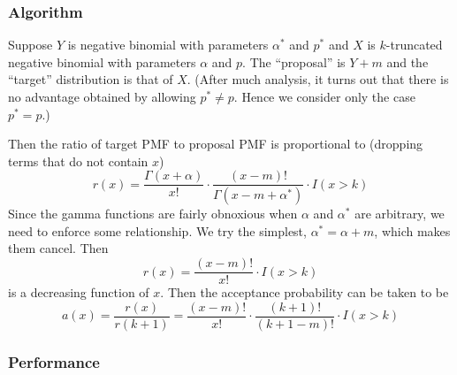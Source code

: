 \documentclass[11pt]{article}
\begin{document}
\subsubsection{Algorithm}

Suppose $Y$ is negative binomial with parameters $\alpha^*$ and $p^*$
and $X$ is $k$-truncated negative binomial with parameters $\alpha$ and $p$.
The ``proposal'' is $Y + m$ and the ``target'' distribution is that of $X$.
(After much analysis, it turns out that there is no advantage obtained
by allowing $p^* \neq p$.  Hence we consider only the case $p^* = p$.)

Then the ratio of target PMF to proposal PMF is proportional to
(dropping terms that do not contain $x$)
$$
   r(x)
   =
   \frac{\Gamma(x + \alpha)}{x !}
   \cdot
   \frac{(x - m) !}{\Gamma(x - m + \alpha^*)}
   \cdot
   I(x > k)
$$
Since the gamma functions are fairly obnoxious when $\alpha$ and $\alpha^*$
are arbitrary, we need to enforce some relationship.  We try the simplest,
$\alpha^* = \alpha + m$, which makes them cancel.
Then
$$
   r(x)
   =
   \frac{(x - m) !}{x !}
   \cdot
   I(x > k)
$$
is a decreasing function of $x$.
Then the acceptance probability
can be taken to be
$$
   a(x)
   =
   \frac{r(x)}{r(k + 1)}
   =
   \frac{(x - m) !}{x !}
   \cdot
   \frac{(k + 1) !}{(k + 1 - m) !}
   \cdot
   I(x > k)
$$

\subsubsection{Performance}
\end{document}
